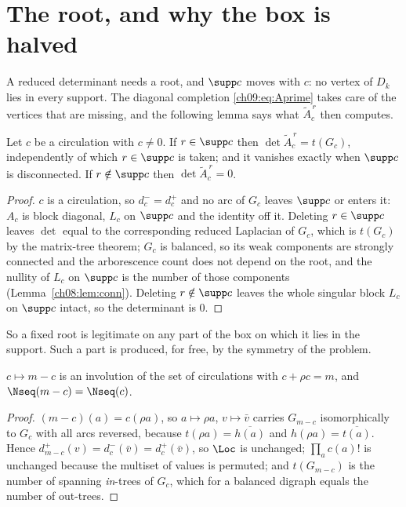 \section{The root, and why the box is halved}\label{ch09:sec:root}

A reduced determinant needs a root, and $\supp c$ moves with $c$: no vertex of $D_k$ lies in
every support. The diagonal completion \eqref{ch09:eq:Aprime} takes care of the vertices that are
missing, and the following lemma says what $\widetilde A^{\,r}_c$ then computes.

\begin{lemma}\label{ch09:lem:root}
Let $c$ be a circulation with $c\ne0$. If $r\in\supp c$ then
$\det\widetilde A^{\,r}_c=t(G_c)$, independently of which $r\in\supp c$ is taken; and it
vanishes exactly when $\supp c$ is disconnected. If $r\notin\supp c$ then
$\det\widetilde A^{\,r}_c=0$.
\end{lemma}

\begin{proof}
$c$ is a circulation, so $d^-_c=d^+_c$ and no arc of $G_c$ leaves $\supp c$ or enters it: $A_c$
is block diagonal, $L_c$ on $\supp c$ and the identity off it. Deleting $r\in\supp c$ leaves
$\det$ equal to the corresponding reduced Laplacian of $G_c$, which is $t(G_c)$ by the
matrix-tree theorem; $G_c$ is balanced, so its weak components are strongly connected and the
arborescence count does not depend on the root, and the nullity of $L_c$ on $\supp c$ is the
number of those components (Lemma~\ref{ch08:lem:conn}). Deleting $r\notin\supp c$ leaves the whole
singular block $L_c$ on $\supp c$ intact, so the determinant is $0$.
\end{proof}

So a fixed root is legitimate on any part of the box on which it lies in the support. Such a
part is produced, for free, by the symmetry of the problem.

\begin{lemma}\label{ch09:lem:sym}
$c\mapsto m-c$ is an involution of the set of circulations with $c+\rho c=m$, and
$\Nseq(m-c)=\Nseq(c)$.
\end{lemma}

\begin{proof}
$(m-c)(a)=c(\rho a)$, so $a\mapsto\rho a$, $v\mapsto\bar v$ carries $G_{m-c}$ isomorphically to
$G_c$ with all arcs reversed, because $t(\rho a)=\overline{h(a)}$ and $h(\rho a)=\overline{t(a)}$.
Hence $d^+_{m-c}(v)=d^-_c(\bar v)=d^+_c(\bar v)$, so $\Loc$ is unchanged; $\prod_ac(a)!$ is
unchanged because the multiset of values is permuted; and $t(G_{m-c})$ is the number of spanning
\emph{in}-trees of $G_c$, which for a balanced digraph equals the number of out-trees.
\end{proof}

